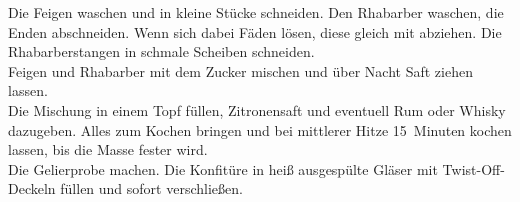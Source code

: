 
      \begin{zubereitung}
        Die Feigen waschen und in kleine Stücke schneiden. Den Rhabarber
	waschen, die Enden abschneiden. Wenn sich dabei Fäden lösen, diese
	gleich mit abziehen. Die Rhabarberstangen in schmale Scheiben
	schneiden. \\
	Feigen und Rhabarber mit dem Zucker mischen und über Nacht Saft ziehen
	lassen. \\
	Die Mischung in einem Topf füllen, Zitronensaft und eventuell Rum oder
	Whisky dazugeben. Alles zum Kochen bringen und bei mittlerer Hitze
	15~Minuten kochen lassen, bis die Masse fester wird. \\
	Die Gelierprobe machen. Die Konfitüre in heiß ausgespülte Gläser mit
	Twist-Off-Deckeln füllen und sofort verschließen. \\
      \end{zubereitung}

